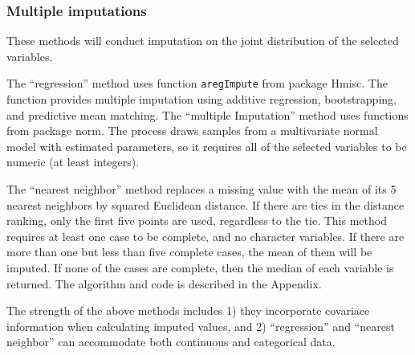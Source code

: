 \documentclass[english]{article}
\newcommand{\pkg}[1]{{\fontseries{b}\selectfont #1}}
\begin{document}
\subsubsection{Multiple imputations}

These methods will conduct imputation on the joint distribution of the selected variables. 

The ``regression'' method uses function \texttt{aregImpute} from package \pkg{Hmisc}. The function provides multiple imputation using additive regression, bootstrapping, and predictive mean matching\citep{hmisc}. The ``multiple Imputation'' method uses functions from package \pkg{norm}. The process draws samples from a multivariate normal model with estimated parameters\citep{norm}, so it requires all of the selected variables to be numeric (at least integers).

The ``nearest neighbor'' method replaces a missing value with the mean of its 5 nearest neighbors by squared Euclidean distance. If there are ties in the distance ranking, only the first five points are used, regardless to the tie. This method requires at least one case to be complete, and no character variables. If there are more than one but less than five complete cases, the mean of them will be imputed. If none of the cases are complete, then the median of each variable is returned. The algorithm and code is described in the Appendix.

The strength of the above methods includes 1) they incorporate covariace information when calculating imputed values, and  2) ``regression'' and ``nearest neighbor'' can accommodate both continuous and categorical data.
\end{document}
